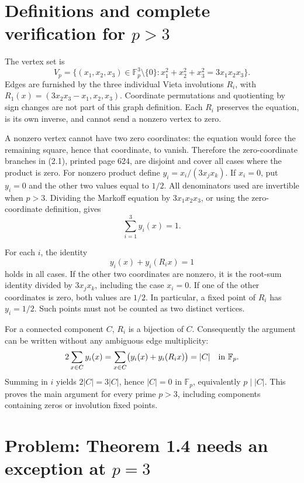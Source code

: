 \documentclass[10pt]{article}
\begin{document}
\section*{Definitions and complete verification for \(p>3\)}
The vertex set is \[V_p=\{(x_1,x_2,x_3)\in\mathbb F_p^3\setminus\{0\}:
 x_1^2+x_2^2+x_3^2=3x_1x_2x_3\}.\] Edges are furnished by the three individual Vieta involutions \(R_i\), with \(R_1(x)=(3x_2x_3-x_1,x_2,x_3)\). Coordinate permutations and quotienting by sign changes are not part of this graph definition. Each \(R_i\) preserves the equation, is its own inverse, and cannot send a nonzero vertex to zero.\par
A nonzero vertex cannot have two zero coordinates: the equation would force the remaining square, hence that coordinate, to vanish. Therefore the zero-coordinate branches in (2.1), printed page 624, are disjoint and cover all cases where the product is zero. For nonzero product define \(y_i=x_i/(3x_jx_k)\). If \(x_i=0\), put \(y_i=0\) and the other two values equal to \(1/2\). All denominators used are invertible when \(p>3\). Dividing the Markoff equation by \(3x_1x_2x_3\), or using the zero-coordinate definition, gives \[\sum_{i=1}^3 y_i(x)=1.\]\par
For each \(i\), the identity \[y_i(x)+y_i(R_i x)=1\] holds in all cases. If the other two coordinates are nonzero, it is the root-sum identity divided by \(3x_jx_k\), including the case \(x_i=0\). If one of the other coordinates is zero, both values are \(1/2\). In particular, a fixed point of \(R_i\) has \(y_i=1/2\). Such points must not be counted as two distinct vertices.\par
For a connected component \(C\), \(R_i\) is a bijection of \(C\). Consequently the argument can be written without any ambiguous edge multiplicity: \[2\sum_{x\in C}y_i(x)
 =\sum_{x\in C}\bigl(y_i(x)+y_i(R_i x)\bigr)=|C|
 \quad\hbox{in }\mathbb F_p.\] Summing in \(i\) yields \(2|C|=3|C|\), hence \(|C|=0\) in \(\mathbb F_p\), equivalently \(p\mid |C|\). This proves the main argument for every prime \(p>3\), including components containing zeros or involution fixed points.\par
\section*{Problem: Theorem 1.4 needs an exception at \(p=3\)}
\end{document}
